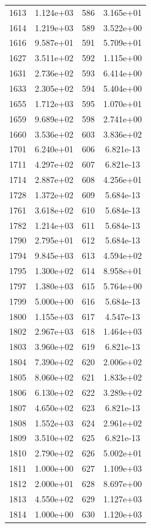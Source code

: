 \documentclass[12pt]{article}
\begin{document}
\begin{longtable}{@{}cccc@{}}
1613 & 1.124e+03 & 586 & 3.165e+01 \\
1614 & 1.219e+03 & 589 & 3.522e+00 \\
1616 & 9.587e+01 & 591 & 5.709e+01 \\
1627 & 3.511e+02 & 592 & 1.115e+00 \\
1631 & 2.736e+02 & 593 & 6.414e+00 \\
1633 & 2.305e+02 & 594 & 5.404e+00 \\
1655 & 1.712e+03 & 595 & 1.070e+01 \\
1659 & 9.689e+02 & 598 & 2.741e+00 \\
1660 & 3.536e+02 & 603 & 3.836e+02 \\
1701 & 6.240e+01 & 606 & 6.821e-13 \\
1711 & 4.297e+02 & 607 & 6.821e-13 \\
1714 & 2.887e+02 & 608 & 4.256e+01 \\
1728 & 1.372e+02 & 609 & 5.684e-13 \\
1761 & 3.618e+02 & 610 & 5.684e-13 \\
1782 & 1.214e+03 & 611 & 5.684e-13 \\
1790 & 2.795e+01 & 612 & 5.684e-13 \\
1794 & 9.845e+03 & 613 & 4.594e+02 \\
1795 & 1.300e+02 & 614 & 8.958e+01 \\
1797 & 1.380e+03 & 615 & 5.764e+00 \\
1799 & 5.000e+00 & 616 & 5.684e-13 \\
1800 & 1.155e+03 & 617 & 4.547e-13 \\
1802 & 2.967e+03 & 618 & 1.464e+03 \\
1803 & 3.960e+02 & 619 & 6.821e-13 \\
1804 & 7.390e+02 & 620 & 2.006e+02 \\
1805 & 8.060e+02 & 621 & 1.833e+02 \\
1806 & 6.130e+02 & 622 & 3.289e+02 \\
1807 & 4.650e+02 & 623 & 6.821e-13 \\
1808 & 1.552e+03 & 624 & 2.961e+02 \\
1809 & 3.510e+02 & 625 & 6.821e-13 \\
1810 & 2.790e+02 & 626 & 5.002e+01 \\
1811 & 1.000e+00 & 627 & 1.109e+03 \\
1812 & 2.000e+01 & 628 & 8.697e+00 \\
1813 & 4.550e+02 & 629 & 1.127e+03 \\
1814 & 1.000e+00 & 630 & 1.120e+03 \\

\end{longtable}
\end{document}
